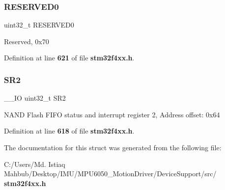 \mbox{\label{structFSMC__Bank2__TypeDef_af86c61a5d38a4fc9cef942a12744486b}} 
\subsubsection{R\+E\+S\+E\+R\+V\+E\+D0}
{\footnotesize\ttfamily uint32\+\_\+t R\+E\+S\+E\+R\+V\+E\+D0}

Reserved, 0x70 

Definition at line \textbf{ 621} of file \textbf{ stm32f4xx.\+h}.

\mbox{\label{structFSMC__Bank2__TypeDef_a89623ee198737b29dc0a803310605a83}} 
\subsubsection{S\+R2}
{\footnotesize\ttfamily \+\_\+\+\_\+\+IO uint32\+\_\+t S\+R2}

N\+A\+ND Flash F\+I\+FO status and interrupt register 2, Address offset\+: 0x64 

Definition at line \textbf{ 618} of file \textbf{ stm32f4xx.\+h}.



The documentation for this struct was generated from the following file\+:\begin{DoxyCompactItemize}
\item 
C\+:/\+Users/\+Md. Istiaq Mahbub/\+Desktop/\+I\+M\+U/\+M\+P\+U6050\+\_\+\+Motion\+Driver/\+Device\+Support/src/\textbf{ stm32f4xx.\+h}\end{DoxyCompactItemize}
